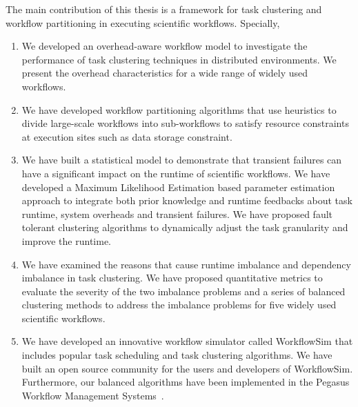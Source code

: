 The main contribution of this thesis is a framework for task clustering and workflow partitioning in executing scientific workflows. Specially, 
\begin{enumerate}
\item We developed an overhead-aware workflow model to investigate the performance of task clustering techniques in distributed environments. We present the overhead characteristics for a wide range of widely used workflows.
\item We have developed workflow partitioning algorithms that use heuristics to divide large-scale workflows into sub-workflows to satisfy resource constraints at execution sites such as data storage constraint. 
\item We have built a statistical model to demonstrate that transient failures can have a significant impact on the runtime of scientific workflows. We have developed a Maximum Likelihood Estimation based parameter estimation approach to integrate both prior knowledge and runtime feedbacks about task runtime, system overheads and transient failures. We have proposed fault tolerant clustering algorithms to dynamically adjust the task granularity and improve the runtime. 
\item We have examined the reasons that cause runtime imbalance and dependency imbalance in task clustering. We have proposed quantitative metrics to evaluate the severity of the two imbalance problems and a series of balanced clustering methods to address the imbalance problems for five widely used scientific workflows. 
\item We have developed an innovative workflow simulator called WorkflowSim that includes popular task scheduling and task clustering algorithms. 
We have built an open source community for the users and developers of WorkflowSim. Furthermore, our balanced algorithms have been implemented in the Pegasus Workflow Management Systems~\cite{Deelman2014}. 
\end{enumerate}
 

